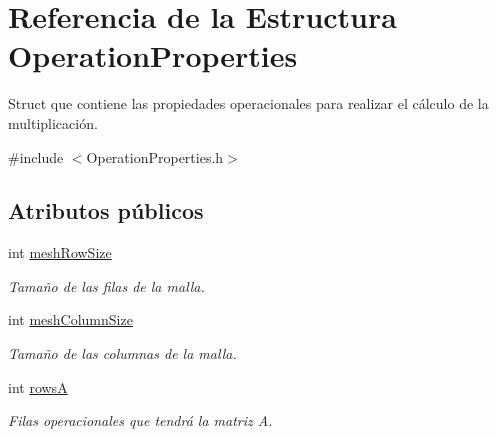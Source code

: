 \hypertarget{structOperationProperties}{}\section{Referencia de la Estructura Operation\+Properties}
\label{structOperationProperties}


Struct que contiene las propiedades operacionales para realizar el cálculo de la multiplicación.  




{\ttfamily \#include $<$Operation\+Properties.\+h$>$}

\subsection*{Atributos públicos}
\begin{DoxyCompactItemize}
\item 
\mbox{\label{structOperationProperties_a5d6b7ce8548f683ace4409090f4c6f68}} 
int \hyperlink{structOperationProperties_a5d6b7ce8548f683ace4409090f4c6f68}{mesh\+Row\+Size}
\begin{DoxyCompactList}\small\item\em Tamaño de las filas de la malla. \end{DoxyCompactList}\item 
\mbox{\label{structOperationProperties_a5989ac2b491b9acb09b4d9b13187a6bf}} 
int \hyperlink{structOperationProperties_a5989ac2b491b9acb09b4d9b13187a6bf}{mesh\+Column\+Size}
\begin{DoxyCompactList}\small\item\em Tamaño de las columnas de la malla. \end{DoxyCompactList}\item 
\mbox{\label{structOperationProperties_a51e92c9db290563d337c7e6501c2e9c6}} 
int \hyperlink{structOperationProperties_a51e92c9db290563d337c7e6501c2e9c6}{rowsA}
\begin{DoxyCompactList}\small\item\em Filas operacionales que tendrá la matriz A. \end{DoxyCompactList}\item 
\mbox{\label{structOperationProperties_ab6b3c2b1976486e9da06d17e537e2850}} 

\end{DoxyCompactItemize}

